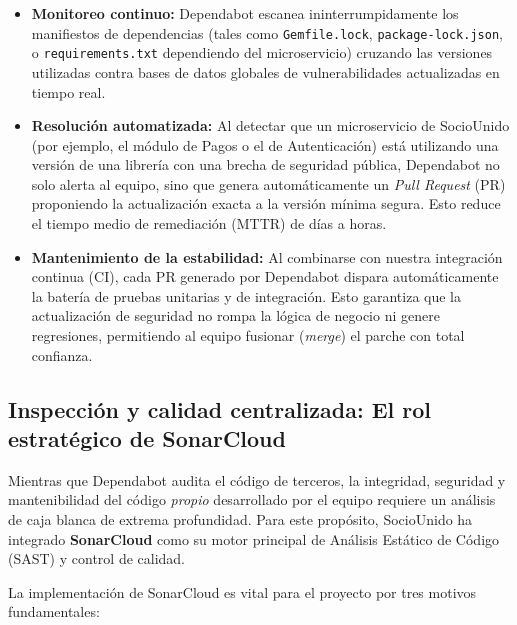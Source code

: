 \begin{itemize}
    \item \textbf{Monitoreo continuo:} Dependabot escanea ininterrumpidamente los manifiestos de dependencias (tales como \texttt{Gemfile.lock}, \texttt{package-lock.json}, o \texttt{requirements.txt} dependiendo del microservicio) cruzando las versiones utilizadas contra bases de datos globales de vulnerabilidades actualizadas en tiempo real.
    \item \textbf{Resolución automatizada:} Al detectar que un microservicio de SocioUnido (por ejemplo, el módulo de Pagos o el de Autenticación) está utilizando una versión de una librería con una brecha de seguridad pública, Dependabot no solo alerta al equipo, sino que genera automáticamente un \textit{Pull Request} (PR) proponiendo la actualización exacta a la versión mínima segura. Esto reduce el tiempo medio de remediación (MTTR) de días a horas.
    \item \textbf{Mantenimiento de la estabilidad:} Al combinarse con nuestra integración continua (CI), cada PR generado por Dependabot dispara automáticamente la batería de pruebas unitarias y de integración. Esto garantiza que la actualización de seguridad no rompa la lógica de negocio ni genere regresiones, permitiendo al equipo fusionar (\textit{merge}) el parche con total confianza.
\end{itemize}

\newpage

\subsection{Inspección y calidad centralizada: El rol estratégico de SonarCloud}

Mientras que Dependabot audita el código de terceros, la integridad, seguridad y mantenibilidad del código \textit{propio} desarrollado por el equipo requiere un análisis de caja blanca de extrema profundidad. Para este propósito, SocioUnido ha integrado \textbf{SonarCloud} como su motor principal de Análisis Estático de Código (SAST) y control de calidad.

La implementación de SonarCloud es vital para el proyecto por tres motivos fundamentales:

